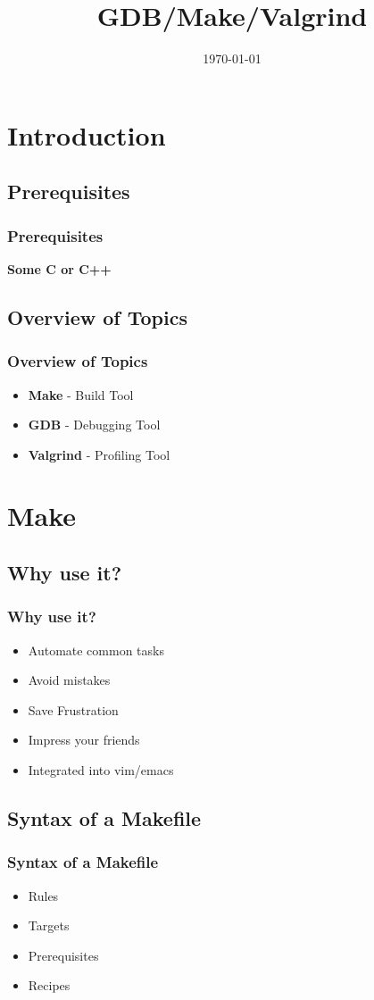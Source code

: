 \documentclass{beamer}
\title{GDB/Make/Valgrind}
\date{\today}
\begin{document}
\frame{\titlepage}

\section{Introduction}
\subsection{Prerequisites}
\frame 
{
    \frametitle{Prerequisites}
    \textbf{Some C or C++}\\
}

\subsection{Overview of Topics}
\frame
{
    \frametitle{Overview of Topics}

    \begin{itemize}
        \item \textbf{Make} - Build Tool
        \item \textbf{GDB} - Debugging Tool
        \item \textbf{Valgrind} - Profiling Tool
    \end{itemize}
}

\section{Make}
\subsection{Why use it?}
\frame
{
    \frametitle{Why use it?}

    \begin{itemize}
        \item Automate common tasks
        \item Avoid mistakes
        \item Save Frustration
        \item Impress your friends
        \item Integrated into vim/emacs
    \end{itemize}
}

\subsection{Syntax of a Makefile}
\frame
{
    \frametitle{Syntax of a Makefile}

    \begin{itemize}
        \item Rules
        \item Targets
        \item Prerequisites
        \item Recipes
    \end{itemize}
}
\end{document}
